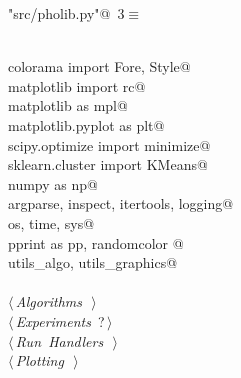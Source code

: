 \documentclass[12pt, english, oneside]{report}
\begin{document}
\begin{flushleft} \small\label{scrap1}\raggedright\small
{} \verb@"src/pholib.py"@\nobreak\ {\footnotesize {3}}$\equiv$
\vspace{-1ex}
\begin{list}{}{} \item
\mbox{}\verb@@\\
\mbox{}\verb@from colorama import Fore, Style@\\
\mbox{}\verb@from matplotlib import rc@\\
\mbox{}\verb@import matplotlib as mpl@\\
\mbox{}\verb@import matplotlib.pyplot as plt@\\
\mbox{}\verb@from scipy.optimize import minimize@\\
\mbox{}\verb@from sklearn.cluster import KMeans@\\
\mbox{}\verb@import numpy as np@\\
\mbox{}\verb@import argparse, inspect, itertools, logging@\\
\mbox{}\verb@import os, time, sys@\\
\mbox{}\verb@import pprint as pp, randomcolor @\\
\mbox{}\verb@import utils_algo, utils_graphics@\\
\mbox{}\verb@@\\
\mbox{}\verb@@\hbox{$\langle\,${\itshape Algorithms}\nobreak\ {\footnotesize {}}$\,\rangle$}\verb@@\\
\mbox{}\verb@@\hbox{$\langle\,${\itshape Experiments}\nobreak\ {\footnotesize ?}$\,\rangle$}\verb@@\\
\mbox{}\verb@@\hbox{$\langle\,${\itshape Run Handlers}\nobreak\ {\footnotesize {}}$\,\rangle$}\verb@@\\
\mbox{}\verb@@\hbox{$\langle\,${\itshape Plotting}\nobreak\ {\footnotesize {}}$\,\rangle$}\verb@@\\
\mbox{}\verb@@{\NWsep}
\end{list}
\vspace{-1.5ex}
\footnotesize
\begin{list}{}{\setlength{\itemsep}{-\parsep}\setlength{\itemindent}{-\leftmargin}}

\item{}
\end{list}
\vspace{4ex}
\end{flushleft}
\end{document}
